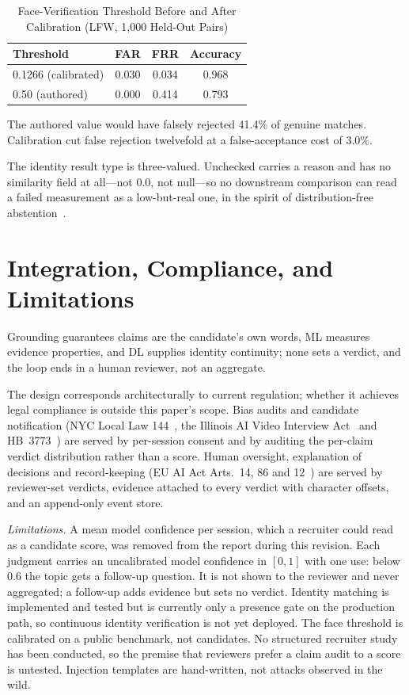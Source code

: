 \documentclass[conference,a4paper]{IEEEtran}
\begin{document}
\begin{table}[t]
\caption{Face-Verification Threshold Before and After Calibration
(LFW, 1,000 Held-Out Pairs)}
\label{tab:face}
\centering
\footnotesize
\begin{tabular}{@{}lccc@{}}
\toprule
Threshold & FAR & FRR & Accuracy \\
\midrule
0.1266 (calibrated) & 0.030 & 0.034 & 0.968 \\
0.50 (authored)     & 0.000 & 0.414 & 0.793 \\
\bottomrule
\end{tabular}
\end{table}

The authored value would have falsely rejected 41.4\% of genuine matches.
Calibration cut false rejection twelvefold at a false-acceptance
cost of 3.0\%. 

The identity result type is three-valued. Unchecked carries a reason and
has no similarity field at all---not 0.0, not null---so no downstream
comparison can read a failed measurement as a low-but-real one, in the spirit
of distribution-free abstention~\cite{vovk2005}.

\section{Integration, Compliance, and Limitations}
Grounding guarantees claims are the candidate's own words, ML measures
evidence properties, and DL supplies identity continuity; none sets a verdict,
and the loop ends in a human reviewer, not an aggregate.

The design corresponds architecturally to current regulation; whether it
achieves legal compliance is outside this paper's scope. Bias audits
and candidate notification (NYC Local Law 144~\cite{nycll144}, the Illinois AI
Video Interview Act~\cite{ilaivia} and HB~3773~\cite{ilhb3773}) are served by
per-session consent and by auditing the per-claim verdict distribution rather
than a score. Human oversight, explanation of decisions and record-keeping (EU
AI Act Arts.~14, 86 and 12~\cite{euaiact}) are served by reviewer-set verdicts,
evidence attached to every verdict with character offsets, and an append-only
event store.

\emph{Limitations.}\label{sec:limits} A mean model confidence
per session, which a recruiter could read as a candidate score, was removed
from the report during this revision.
Each judgment carries an uncalibrated model confidence in $[0,1]$ with one
use: below 0.6 the topic gets a follow-up question. It is not shown to the
reviewer and never aggregated; a follow-up adds evidence but sets no verdict.
Identity matching is implemented and tested but is currently only
a presence gate on the production path, so continuous identity verification is
not yet deployed. The face threshold is calibrated on a public benchmark, not
candidates. No structured recruiter study has been conducted, so the premise
that reviewers prefer a claim audit to a score is untested. Injection templates are
hand-written, not attacks observed in the wild.
\end{document}
